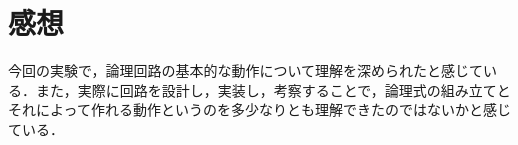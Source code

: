 %
%
%
\section{感想}
\label{feeling}
今回の実験で，論理回路の基本的な動作について理解を深められたと感じている．また，実際に回路を設計し，実装し，考察することで，論理式の組み立てとそれによって作れる動作というのを多少なりとも理解できたのではないかと感じている．
